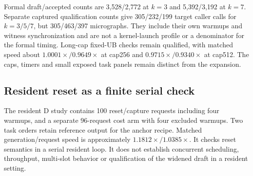 

Formal draft/accepted counts are 3,528/2,772 at $k=3$ and 5,392/3,192 at $k=7$. Separate captured qualification counts give 305/232/199 target caller calls for $k=3/5/7$, but 305/463/397 micrographs. They include their own warmups and witness synchronization and are not a kernel-launch profile or a denominator for the formal timing. Long-cap fixed-UB checks remain qualified, with matched speed about $1.0001\times/0.9649\times$ at cap256 and $0.9715\times/0.9340\times$ at cap512. The caps, timers and small exposed task panels remain distinct from the expansion.

\subsection{Resident reset as a finite serial check}
The resident D study contains 100 reset/capture requests including four warmups, and a separate 96-request cost arm with four excluded warmups. Two task orders retain reference output for the anchor recipe. Matched generation/request speed is approximately $1.1812\times/1.0385\times$. It checks reset semantics in a serial resident loop. It does not establish concurrent scheduling, throughput, multi-slot behavior or qualification of the widened draft in a resident setting.
